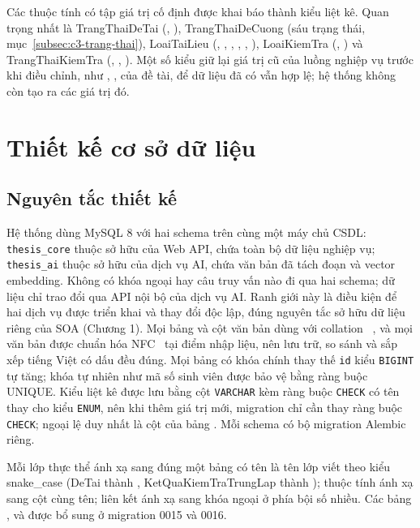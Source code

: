 \documentclass[../main.tex]{subfiles}
\begin{document}
Các thuộc tính có tập giá trị cố định được khai báo thành kiểu liệt kê. Quan trọng nhất là TrangThaiDeTai (, ), TrangThaiDeCuong (sáu trạng thái, mục~\ref{subsec:c3-trang-thai}), LoaiTaiLieu (, , , , , ), LoaiKiemTra (, ) và TrangThaiKiemTra (, , ). Một số kiểu giữ lại giá trị cũ của luồng nghiệp vụ trước khi điều chỉnh, như , ,  của đề tài, để dữ liệu đã có vẫn hợp lệ; hệ thống không còn tạo ra các giá trị đó.

\section{Thiết kế cơ sở dữ liệu}\label{sec:c3-csdl}

\subsection{Nguyên tắc thiết kế}\label{subsec:c3-thesis-ai}

Hệ thống dùng MySQL 8 với hai schema trên cùng một máy chủ CSDL: \texttt{thesis\_core} thuộc sở hữu của Web API, chứa toàn bộ dữ liệu nghiệp vụ; \texttt{thesis\_ai} thuộc sở hữu của dịch vụ AI, chứa văn bản đã tách đoạn và vector embedding. Không có khóa ngoại hay câu truy vấn nào đi qua hai schema; dữ liệu chỉ trao đổi qua API nội bộ của dịch vụ AI. Ranh giới này là điều kiện để hai dịch vụ được triển khai và thay đổi độc lập, đúng nguyên tắc sở hữu dữ liệu riêng của SOA (Chương 1). Mọi bảng và cột văn bản dùng  với collation ~\cite{mysqlutf8mb4}, và mọi văn bản được chuẩn hóa NFC~\cite{unicodetr15} tại điểm nhập liệu, nên lưu trữ, so sánh và sắp xếp tiếng Việt có dấu đều đúng. Mọi bảng có khóa chính thay thế \texttt{id} kiểu \texttt{BIGINT} tự tăng; khóa tự nhiên như mã số sinh viên được bảo vệ bằng ràng buộc UNIQUE. Kiểu liệt kê được lưu bằng cột \texttt{VARCHAR} kèm ràng buộc \texttt{CHECK} có tên thay cho kiểu \texttt{ENUM}, nên khi thêm giá trị mới, migration chỉ cần thay ràng buộc \texttt{CHECK}; ngoại lệ duy nhất là cột  của bảng . Mỗi schema có bộ migration Alembic~\cite{alembic} riêng.

Mỗi lớp thực thể ánh xạ sang đúng một bảng có tên là tên lớp viết theo kiểu snake\_case (DeTai thành , KetQuaKiemTraTrungLap thành ); thuộc tính ánh xạ sang cột cùng tên; liên kết ánh xạ sang khóa ngoại ở phía bội số nhiều. Các bảng ,  và  được bổ sung ở migration 0015 và 0016.
\end{document}
